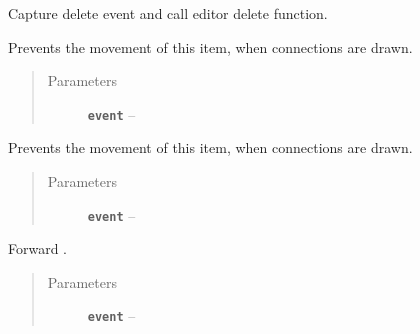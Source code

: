 \documentclass[a4paper,10pt,english]{sphinxmanual}
\begin{document}
\begin{fulllineitems}
\begin{fulllineitems}
\label{model_link:model.PlaceItem.PlaceItem.deleteItemLocal}
Capture delete event and call editor delete function.

\end{fulllineitems}


\begin{fulllineitems}
\label{model_link:model.PlaceItem.PlaceItem.mouseMoveEvent}
Prevents the movement of this item, when connections are drawn.
\begin{quote}\begin{description}
\item[{Parameters}] \leavevmode
\textbf{\texttt{event}} -- 

\end{description}\end{quote}

\end{fulllineitems}


\begin{fulllineitems}
\label{model_link:model.PlaceItem.PlaceItem.mousePressEvent}
Prevents the movement of this item, when connections are drawn.
\begin{quote}\begin{description}
\item[{Parameters}] \leavevmode
\textbf{\texttt{event}} -- 

\end{description}\end{quote}

\end{fulllineitems}


\begin{fulllineitems}
\label{model_link:model.PlaceItem.PlaceItem.mouseReleaseEvent}
Forward .
\begin{quote}\begin{description}
\item[{Parameters}] \leavevmode
\textbf{\texttt{event}} -- 


\end{description}
\end{quote}
\end{fulllineitems}
\end{fulllineitems}
\end{document}
